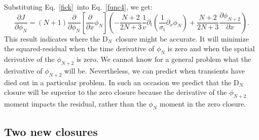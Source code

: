 \documentclass[review]{elsarticle}
\newcommand{\st}{\sigma_\mathrm{t}}
\newcommand{\dn}{D$_N$}
\newcommand{\ppz}{\partial_x}%
\newcommand{\psii}[1]{\phi_\ensuremath{{#1}}}
\begin{document}
Substituting Eq.~\eqref{fick}~into Eq.~\eqref{func4}, we get:
%
\begin{equation}\label{bd2}
\frac{\partial J}{\partial\psii{N}}=(N+1)
\frac{\partial}{\partial\psii{N}}\left[\frac{\partial}{\partial x}\psii{N}\right]
\left(-\frac{N+2}{2N+3}\frac{1}{v}\partial_t\left(\frac{1}{\st}\ppz\psii{N}\right)+\frac{N+2}{2N+3}\frac{\partial\phi_{N+2}}{\partial x}\right).
\end{equation}
This result indicates where the \dn\, closure might be accurate. It will minimize the squared-residual when the time derivative of  $\phi_N$ is zero and when the spatial derivative of the $\phi_{N+2}$ is zero.  We cannot know for a general problem what the derivative of $\phi_{N+2}$ will be. Nevertheless, we can predict when transients have died out in a particular problem.  In such an occasion we predict that the \dn\, closure will be superior to the zero closure because the derivative of the $\phi_{N+2}$ moment impacts the residual, rather than the $\phi_N$ moment in the zero closure.

\subsection{Two new closures}
\end{document}
